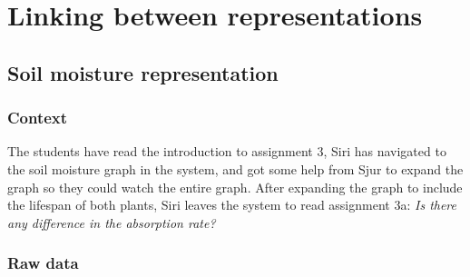 \section{Linking between representations}
\subsection{Soil moisture representation}


\subsubsection*{Context}
The students have read the introduction to assignment 3, Siri has navigated to the soil moisture graph in the system, and got some help from Sjur to expand the graph so they could watch the entire graph. After expanding the graph to include the lifespan of both plants, Siri leaves the system to read assignment 3a: \emph{Is there any difference in the absorption rate?}



\subsubsection*{Raw data}

